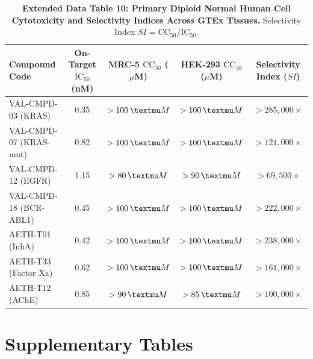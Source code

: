 \documentclass[11pt,a4paper]{article}
\begin{document}
\vspace{1em}

\begin{table}[h!]
\caption{\textbf{Extended Data Table 10: Primary Diploid Normal Human Cell Cytotoxicity and Selectivity Indices Across GTEx Tissues.} Selectivity Index $SI = \text{CC}_{50}/\text{IC}_{50}$.}
\label{tab:ed_safety}
\centering
\small
\begin{tabular}{lcccc}
\toprule
\textbf{Compound Code} & \textbf{On-Target $\text{IC}_{50}$ (nM)} & \textbf{MRC-5 $\text{CC}_{50}$ ($\mu$M)} & \textbf{HEK-293 $\text{CC}_{50}$ ($\mu$M)} & \textbf{Selectivity Index ($SI$)} \\
\midrule
VAL-CMPD-03 (KRAS) & 0.35 & $>100\,\textmu M$ & $>100\,\textmu M$ & $>285,000\times$ \\
VAL-CMPD-07 (KRAS-mut) & 0.82 & $>100\,\textmu M$ & $>100\,\textmu M$ & $>121,000\times$ \\
VAL-CMPD-12 (EGFR) & 1.15 & $>80\,\textmu M$ & $>90\,\textmu M$ & $>69,500\times$ \\
VAL-CMPD-18 (BCR-ABL1) & 0.45 & $>100\,\textmu M$ & $>100\,\textmu M$ & $>222,000\times$ \\
AETH-T01 (InhA) & 0.42 & $>100\,\textmu M$ & $>100\,\textmu M$ & $>238,000\times$ \\
AETH-T33 (Factor Xa) & 0.62 & $>100\,\textmu M$ & $>100\,\textmu M$ & $>161,000\times$ \\
AETH-T12 (AChE) & 0.85 & $>90\,\textmu M$ & $>85\,\textmu M$ & $>100,000\times$ \\
\bottomrule
\end{tabular}
\end{table}

\newpage

\section*{Supplementary Tables}
\end{document}
